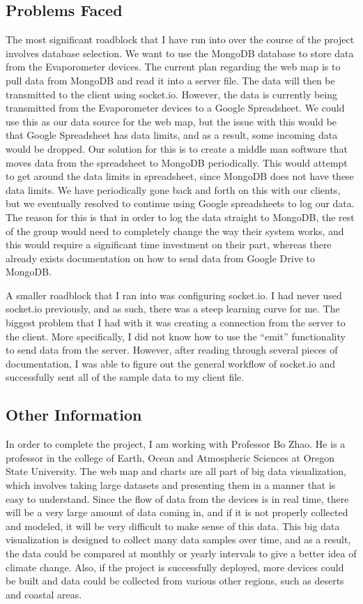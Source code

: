 \documentclass[onecolumn, draftclsnofoot,10pt, compsoc]{IEEEtran}
\begin{document}
\subsection{Problems Faced}
The most significant roadblock that I have run into over the course of the project involves database selection. We want to use the MongoDB database to store data from the Evaporometer devices. The current plan regarding the web map is to pull data from MongoDB and read it into a server file. The data will then be transmitted to the client using socket.io. However, the data is currently being transmitted from the Evaporometer devices to a Google Spreadsheet. We could use this as our data source for the web map, but the issue with this would be that Google Spreadsheet has data limits, and as a result, some incoming data would be dropped. Our solution for this is to create a middle man software that moves data from the spreadsheet to MongoDB periodically. This would attempt to get around the data limits in spreadsheet, since MongoDB does not have these data limits. We have periodically gone back and forth on this with our clients, but we eventually resolved to continue using Google spreadsheets to log our data. The reason for this is that in order to log the data straight to MongoDB, the rest of the group would need to completely change the way their system works, and this would require a significant time investment on their part, whereas there already exists documentation on how to send data from Google Drive to MongoDB.


	A smaller roadblock that I ran into was configuring socket.io. I had never used socket.io previously, and as such, there was a steep learning curve for me. The biggest problem that I had with it was creating a connection from the server to the client. More specifically, I did not know how to use the “emit” functionality to send data from the server. However, after reading through several pieces of documentation, I was able to figure out the general workflow of socket.io and successfully sent all of the sample data to my client file. 

\subsection{Other Information}
In order to complete the project, I am working with Professor Bo Zhao. He is a professor in the college of Earth, Ocean and Atmospheric Sciences at Oregon State University. The web map and charts are all part of big data visualization, which involves taking large datasets and presenting them in a manner that is easy to understand. Since the flow of data from the devices is in real time, there will be a very large amount of data coming in, and if it is not properly collected and modeled, it will be very difficult to make sense of this data. This big data visualization is designed to collect many data samples over time, and as a result, the data could be compared at monthly or yearly intervals to give a better idea of climate change. Also, if the project is successfully deployed, more devices could be built and data could be collected from various other regions, such as deserts and coastal areas.
\end{document}
